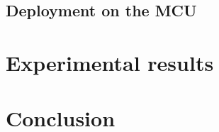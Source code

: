 \documentclass[12pt]{report}
\begin{document}
\section{Deployment on the MCU}









\chapter{Experimental results} 






\chapter{Conclusion}













\end{document}
